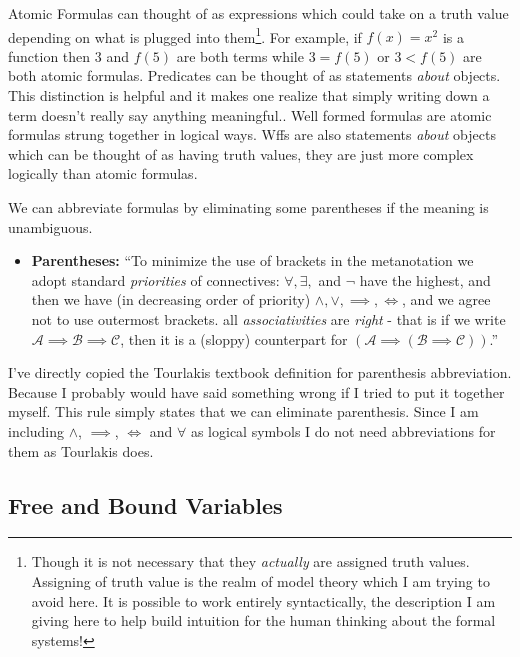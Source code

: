 \documentclass[12pt]{article}
\newcommand{\mc}[1]{\mathcal{#1}}
\begin{document}
Atomic Formulas can thought of as expressions which could take on a truth value depending on what is plugged into them\footnote{Though it is not necessary that they \textit{actually} are assigned truth values. Assigning of truth value is the realm of model theory which I am trying to avoid here. It is possible to work entirely syntactically, the description I am giving here to help build intuition for the human thinking about the formal systems!}. For example, if $f(x)=x^2$ is a function then $3$ and $f(5)$ are both terms while $3 = f(5)$ or $3 < f(5)$ are both atomic formulas. Predicates can be thought of as statements \textit{about} objects. This distinction is helpful and it makes one realize that simply writing down a term doesn't really say anything meaningful.. Well formed formulas are atomic formulas strung together in logical ways. Wffs are also statements \textit{about} objects which can be thought of as having truth values, they are just more complex logically than atomic formulas.

We can abbreviate formulas by eliminating some parentheses if the meaning is unambiguous.

\hrulefill
\begin{itemize}
\item{\textbf{Parentheses:} ``To minimize the use of brackets in the metanotation we adopt standard \textit{priorities} of connectives: $\forall, \exists,$ and $\lnot$ have the highest, and then we have (in decreasing order of priority) $\land, \lor, \implies, \iff$, and we agree not to use outermost brackets. all \textit{associativities} are \textit{right} - that is if we write $\mc{A} \implies \mc{B} \implies \mc{C}$, then it is a (sloppy) counterpart for $(\mc{A} \implies ( \mc{B} \implies \mc{C}))$.''}
\end{itemize}
\hrulefill

I've directly copied the Tourlakis textbook definition for parenthesis abbreviation. Because I probably would have said something wrong if I tried to put it together myself. This rule simply states that we can eliminate parenthesis. Since I am including $\land$, $\implies$, $\iff$ and $\forall$ as logical symbols I do not need abbreviations for them as Tourlakis does.

\subsection{Free and Bound Variables}


\hrulefill
\end{document}
